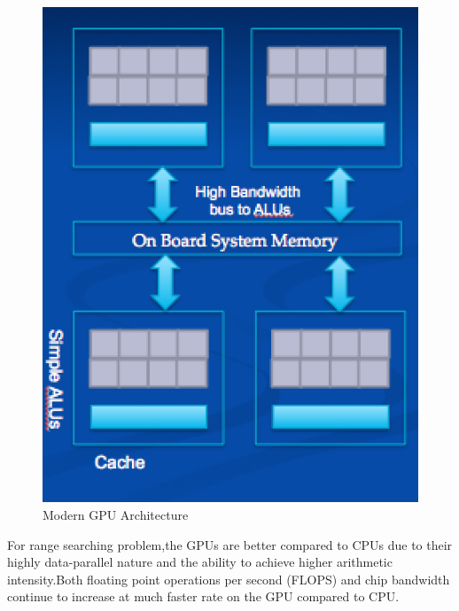 \documentclass{article}
\begin{document}
 \begin{figure}[H]
 \centering
\includegraphics[scale=0.8]{GPU_Architecture}
\caption{Modern GPU Architecture}
 \end{figure}
 
 

For range searching problem,the GPUs are better compared to CPUs due to their highly data-parallel nature and the ability to achieve higher arithmetic intensity.Both floating point operations per second (FLOPS) and chip bandwidth continue to increase at much faster rate on the GPU compared to CPU.
 
\end{document}
